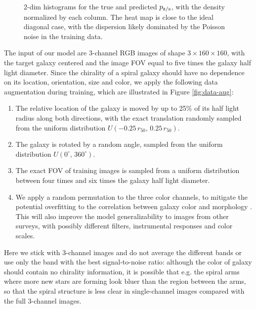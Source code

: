 \documentclass[twocolumn]{aastex631}
\begin{document}
\begin{figure}
    \caption{2-dim histograms for the true and predicted $p_{\rm z/s}$, with the density normalized by each column.
    The heat map is close to the ideal diagonal case, with the dispersion likely dominated by the Poisson noise in the training data.}
    \label{fig:heat}
\end{figure}

The input of our model are 3-channel RGB images of shape $3\times160\times160$, with the target galaxy centered and the image FOV equal to five times the galaxy half light diameter.
Since the chirality of a spiral galaxy should have no dependence on its location, orientation, size and color, we apply the following data augmentation during training, which are illustrated in Figure \ref{fig:data-aug}:
\begin{enumerate}
    \item The relative location of the galaxy is moved by up to 25\% of its half light radius along both directions, with the exact translation randomly sampled from the uniform distribution $U(-0.25\,r_{50},\,0.25\,r_{50})$.
    \item The galaxy is rotated by a random angle, sampled from the uniform distribution $U(0^{\circ},\,360^{\circ})$.
    \item The exact FOV of training images is sampled from a uniform distribution between four times and six times the galaxy half light diameter.
    \item We apply a random permutation to the three color channels, to mitigate the potential overfitting to the correlation between galaxy color and morphology \citep[e.g.][]{bamford2009galaxy}. This will also improve the model generalizability to images from other surveys, with possibly different filters, instrumental responses and color scales.
\end{enumerate}
Here we stick with 3-channel images and do not average the different bands or use only the band with the best signal-to-noise ratio: although the color of galaxy should contain no chirality information, it is possible that e.g. the spiral arms where more new stars are forming look bluer than the region between the arms, so that the spiral structure is less clear in single-channel images compared with the full 3-channel images.

\end{document}
